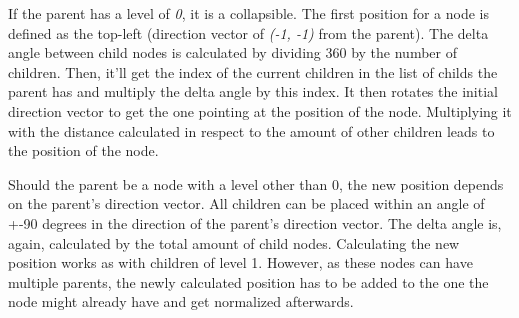 If the parent has a level of \emph{0}, it is a collapsible. The first position for a node is defined as the top-left (direction vector of \emph{(-1, -1)} from the parent). The delta angle between child nodes is calculated by dividing 360 by the number of children. Then, it'll get the index of the current children in the list of childs the parent has and multiply the delta angle by this index. It then rotates the initial direction vector to get the one pointing at the position of the node. Multiplying it with the distance calculated in respect to the amount of other children leads to the position of the node.

Should the parent be a node with a level other than 0, the new position depends on the parent's direction vector. All children can be placed within an angle of +-90 degrees in the direction of the parent's direction vector. The delta angle is, again, calculated by the total amount of child nodes. Calculating the new position works as with children of level 1. However, as these nodes can have multiple parents, the newly calculated position has to be added to the one the node might already have and get normalized afterwards. \\

